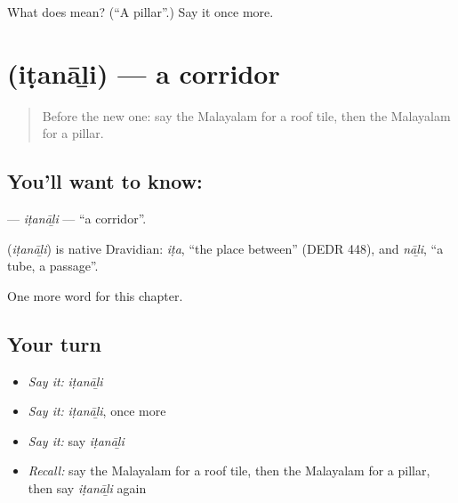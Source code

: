 \begin{tcolorbox}[breakable,colback=teal!4,colframe=teal!35!black,title={Before you move on}]
What does  mean? (\textquotedblleft{}A pillar\textquotedblright{}.) Say it once more.
\end{tcolorbox}
\section[\texorpdfstring{\ml{ഇടനാഴി} (iṭanāḻi)}{ഇടനാഴി (iṭanāḻi)}]{ (iṭanāḻi) — a corridor}

\label{lesson:ML-C257-itanali}



\begin{quote}
Before the new one: say the Malayalam for a roof tile, then the Malayalam for a pillar.
\end{quote}

\subsection*{You'll want to know: }
\textbf{} — \emph{iṭanāḻi} — \textquotedblleft{}a corridor\textquotedblright{}.

\begin{cousinweb}
\textbf{} (\emph{iṭanāḻi}) is native Dravidian: \emph{iṭa}, \textquotedblleft{}the place between\textquotedblright{} (DEDR 448), and \emph{nāḻi}, \textquotedblleft{}a tube, a passage\textquotedblright{}.
\end{cousinweb}

\begin{grammarlens}[title={What you've built}]
One more word for this chapter.
\end{grammarlens}

\subsection*{Your turn}
\begin{itemize}
\raggedright
  \item \emph{Say it:} \emph{iṭanāḻi}
  \item \emph{Say it:} \emph{iṭanāḻi}, once more
  \item \emph{Say it:} say \emph{iṭanāḻi}
  \item \emph{Recall:} say the Malayalam for a roof tile, then the Malayalam for a pillar, then say \emph{iṭanāḻi} again
\end{itemize}

